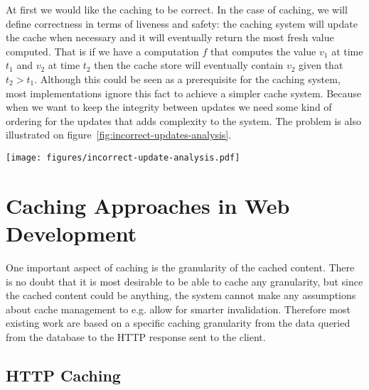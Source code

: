 At first we would like the caching to be correct. In the case of caching, we will define correctness in terms of liveness and safety: the caching system will update the cache when necessary and it will eventually return the most fresh value computed. That is if we have a computation $f$ that computes the value $v_1$ at time $t_1$ and $v_2$ at time $t_2$ then the cache store will eventually contain $v_2$ given that $t_2 > t_1$. Although this could be seen as a prerequisite for the caching system, most implementations ignore this fact to achieve a simpler cache system. Because when we want to keep the integrity between updates we need some kind of ordering for the updates that adds complexity to the system. The problem is also illustrated on figure~\ref{fig:incorrect-updates-analysis}.

\begin{figure*}[ht!]
  \centering
  \texttt{[image: figures/incorrect-update-analysis.pdf]}
  \caption{Showing how two concurrent caching updates from two different application servers results in an inconsistent state. We see that even though the request from \emph{Web 2} are based on data older than \emph{Web 1} it gets to write }
  \label{fig:incorrect-updates-analysis}
\end{figure*}




\section{Caching Approaches in Web Development}
\label{sec:caching_approaches_in_web_development}


One important aspect of caching is the granularity of the cached content. There is no doubt that it is most desirable to be able to cache any granularity, but since the cached content could be anything, the system cannot make any assumptions about cache management to e.g. allow for smarter invalidation. Therefore most existing work are based on a specific caching granularity from the data queried from the database to the HTTP response sent to the client.

\subsection{HTTP Caching}
\label{subsec:http_caching}

